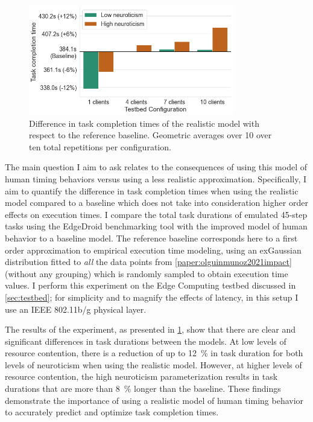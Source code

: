 \begin{figure}
    \centering
    \includegraphics[height=13em]{Figs/2023EdgeDroid2/task_durations_diff}
    \caption{Difference in task completion times of the realistic model with respect to the reference baseline.
    Geometric averages over \num{10} over ten total repetitions per configuration.}\label{fig:taskcompletiontimesdiff}
\end{figure}

The main question I aim to ask relates to the consequences of using this model of human timing behaviors versus using a less realistic approximation.
Specifically, I aim to quantify the difference in task completion times when using the realistic model compared to a baseline which does not take into consideration higher order effects on execution times.
I compare the total task durations of emulated \num{45}-step tasks using the EdgeDroid benchmarking tool with the improved model of human behavior to a baseline model.
The reference baseline corresponds here to a first order approximation to empirical execution time modeling, using an \gls{exGaussian} distribution fitted to \emph{all} the data points from \cref{paper:olguinmunoz2021impact} (without any grouping) which is randomly sampled to obtain execution time values.
I perform this experiment on the Edge Computing testbed discussed in \cref{sec:testbed};
for simplicity and to magnify the effects of latency, in this setup I use an \acs{IEEE} \num{802.11}b/g physical layer.

The results of the experiment, as presented in \cref{fig:taskcompletiontimesdiff}, show that there are clear and significant differences in task durations between the models.
At low levels of resource contention, there is a reduction of up to \SI{12}{\percent} in task duration for both levels of neuroticism when using the realistic model.
However, at higher levels of resource contention, the high neuroticism parameterization results in task durations that are more than \SI{8}{\percent} longer than the baseline.
These findings demonstrate the importance of using a realistic model of human timing behavior to accurately predict and optimize task completion times.

